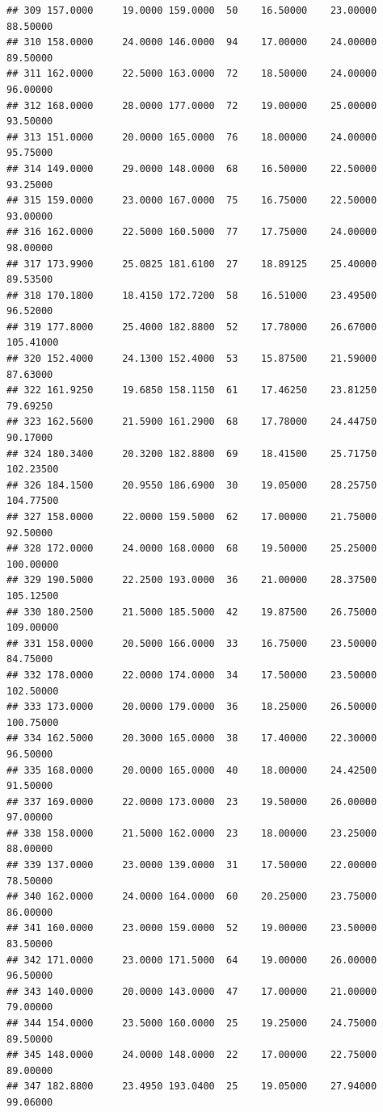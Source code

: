 \documentclass[]{article}
\begin{document}
\begin{verbatim}
## 309 157.0000     19.0000 159.0000  50    16.50000    23.00000  88.50000
## 310 158.0000     24.0000 146.0000  94    17.00000    24.00000  89.50000
## 311 162.0000     22.5000 163.0000  72    18.50000    24.00000  96.00000
## 312 168.0000     28.0000 177.0000  72    19.00000    25.00000  93.50000
## 313 151.0000     20.0000 165.0000  76    18.00000    24.00000  95.75000
## 314 149.0000     29.0000 148.0000  68    16.50000    22.50000  93.25000
## 315 159.0000     23.0000 167.0000  75    16.75000    22.50000  93.00000
## 316 162.0000     22.5000 160.5000  77    17.75000    24.00000  98.00000
## 317 173.9900     25.0825 181.6100  27    18.89125    25.40000  89.53500
## 318 170.1800     18.4150 172.7200  58    16.51000    23.49500  96.52000
## 319 177.8000     25.4000 182.8800  52    17.78000    26.67000 105.41000
## 320 152.4000     24.1300 152.4000  53    15.87500    21.59000  87.63000
## 322 161.9250     19.6850 158.1150  61    17.46250    23.81250  79.69250
## 323 162.5600     21.5900 161.2900  68    17.78000    24.44750  90.17000
## 324 180.3400     20.3200 182.8800  69    18.41500    25.71750 102.23500
## 326 184.1500     20.9550 186.6900  30    19.05000    28.25750 104.77500
## 327 158.0000     22.0000 159.5000  62    17.00000    21.75000  92.50000
## 328 172.0000     24.0000 168.0000  68    19.50000    25.25000 100.00000
## 329 190.5000     22.2500 193.0000  36    21.00000    28.37500 105.12500
## 330 180.2500     21.5000 185.5000  42    19.87500    26.75000 109.00000
## 331 158.0000     20.5000 166.0000  33    16.75000    23.50000  84.75000
## 332 178.0000     22.0000 174.0000  34    17.50000    23.50000 102.50000
## 333 173.0000     20.0000 179.0000  36    18.25000    26.50000 100.75000
## 334 162.5000     20.3000 165.0000  38    17.40000    22.30000  96.50000
## 335 168.0000     20.0000 165.0000  40    18.00000    24.42500  91.50000
## 337 169.0000     22.0000 173.0000  23    19.50000    26.00000  97.00000
## 338 158.0000     21.5000 162.0000  23    18.00000    23.25000  88.00000
## 339 137.0000     23.0000 139.0000  31    17.50000    22.00000  78.50000
## 340 162.0000     24.0000 164.0000  60    20.25000    23.75000  86.00000
## 341 160.0000     23.0000 159.0000  52    19.00000    23.50000  83.50000
## 342 171.0000     23.0000 171.5000  64    19.00000    26.00000  96.50000
## 343 140.0000     20.0000 143.0000  47    17.00000    21.00000  79.00000
## 344 154.0000     23.5000 160.0000  25    19.25000    24.75000  89.50000
## 345 148.0000     24.0000 148.0000  22    17.00000    22.75000  89.00000
## 347 182.8800     23.4950 193.0400  25    19.05000    27.94000  99.06000

\end{verbatim}
\end{document}
